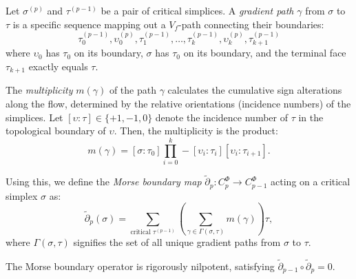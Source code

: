 \begin{definition}
Let $\sigma^{(p)}$ and $\tau^{(p-1)}$ be a pair of critical simplices. A \emph{gradient path} $\gamma$ from $\sigma$ to $\tau$ is a specific sequence mapping out a $V_f$-path connecting their boundaries:
\[ \tau_0^{(p-1)}, \upsilon_0^{(p)}, \tau_1^{(p-1)}, \dots, \tau_k^{(p-1)}, \upsilon_k^{(p)}, \tau_{k+1}^{(p-1)} \]
where $\upsilon_0$ has $\tau_0$ on its boundary, $\sigma$ has $\tau_0$ on its boundary, and the terminal face $\tau_{k+1}$ exactly equals $\tau$. 

The \emph{multiplicity} $m(\gamma)$ of the path $\gamma$ calculates the cumulative sign alterations along the flow, determined by the relative orientations (incidence numbers) of the simplices. Let $[\upsilon : \tau] \in \{+1, -1, 0\}$ denote the incidence number of $\tau$ in the topological boundary of $\upsilon$. Then, the multiplicity is the product:
\[ m(\gamma) = [\sigma : \tau_0] \prod_{i=0}^k -[\upsilon_i : \tau_i] [\upsilon_i : \tau_{i+1}]. \]

Using this, we define the \emph{Morse boundary map} $\tilde{\partial}_p : C_p^\Phi \to C_{p-1}^\Phi$ acting on a critical simplex $\sigma$ as:
\[ \tilde{\partial}_p(\sigma) = \sum_{\text{critical } \tau^{(p-1)}} \left( \sum_{\gamma \in \Gamma(\sigma, \tau)} m(\gamma) \right) \tau, \]
where $\Gamma(\sigma, \tau)$ signifies the set of all unique gradient paths from $\sigma$ to $\tau$.
\end{definition}

\begin{lemma}
\label{lem:morse_boundary_nilpotent}
The Morse boundary operator is rigorously nilpotent, satisfying $\tilde{\partial}_{p-1} \circ \tilde{\partial}_p = 0$.
\end{lemma}

